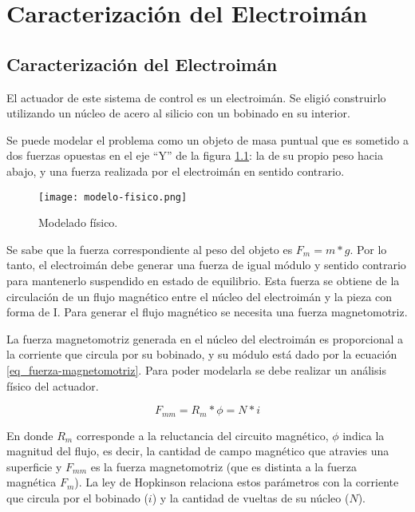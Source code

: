 \chapter{Caracterización del  Electroimán}  \label{cap:CaracterizaciónElectroimán}

\section{Caracterización del Electroimán}

El actuador de este sistema de control es un electroimán. Se eligió construirlo utilizando un núcleo de acero al silicio con un bobinado en su interior. 

Se puede modelar el problema como un objeto de masa puntual que es sometido a dos fuerzas opuestas en el eje “Y” de la figura \ref{fig:img_modelado-fisico}: la de su propio peso hacia abajo, y una fuerza realizada por el electroimán en sentido contrario.

\begin{figure}[H]
	\centering
	\texttt{[image: modelo-fisico.png]}
	\caption{Modelado físico.}
	\label{fig:img_modelado-fisico}
\end{figure}

Se sabe que la fuerza correspondiente al peso del objeto es $F_{m}=m*g$. Por lo tanto, el electroimán debe generar una fuerza de igual módulo y sentido contrario para mantenerlo suspendido en estado de equilibrio. Esta fuerza se obtiene de la circulación de un flujo magnético entre el núcleo del electroimán y la pieza con forma de I. Para generar el flujo magnético se necesita una fuerza magnetomotriz.

La fuerza magnetomotriz generada en el núcleo del electroimán es proporcional a la corriente que circula por su bobinado, y su módulo está dado por la ecuación \ref{eq_fuerza-magnetomotriz}. Para poder modelarla se debe realizar un análisis físico del actuador. 

\begin{equation} \label{eq_fuerza-magnetomotriz}
	F_{mm}=R_{m}*\phi=N*i	
\end{equation}

En donde $R_{m}$ corresponde a la reluctancia del circuito magnético, $\phi$ indica la magnitud del flujo, es decir, la cantidad de campo magnético que atravies una superficie y $F_{mm}$ es la fuerza magnetomotriz (que es distinta a la fuerza magnética $F_{m}$). La ley de Hopkinson relaciona estos parámetros con la corriente que circula por el bobinado ($i$) y la cantidad de vueltas de su núcleo ($N$).


